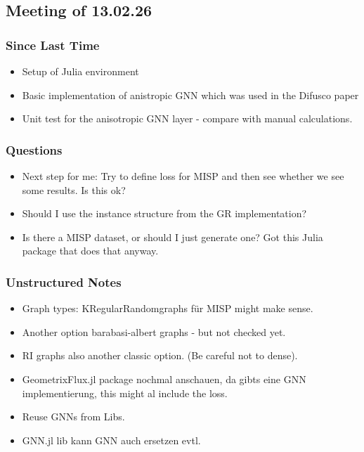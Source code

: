 
\subsection{Meeting of 13.02.26}
\subsubsection{Since Last Time}
\begin{itemize}
    \item Setup of Julia environment    
    \item Basic implementation of anistropic GNN which was used in the Difusco paper
    \item Unit test for the anisotropic GNN layer - compare with manual calculations.
\end{itemize}
\subsubsection{Questions}
\begin{itemize}
    \item Next step for me: Try to define loss for MISP and then see whether we see some results. Is this ok?
    \item Should I use the instance structure from the GR implementation?
    \item Is there a MISP dataset, or should I just generate one? Got this Julia package that does that anyway.
\end{itemize}
\subsubsection{Unstructured Notes}
\begin{itemize}
    \item Graph types: KRegularRandomgraphs für MISP might make sense. 
    \item Another option barabasi-albert graphs - but not checked yet.
    \item RI graphs also another classic option. (Be careful not to dense).
    \item GeometrixFlux.jl package nochmal anschauen, da gibts eine GNN implementierung, this might al include the loss.
    \item Reuse GNNs from Libs.
    \item GNN.jl lib kann GNN auch ersetzen evtl. 
\end{itemize}